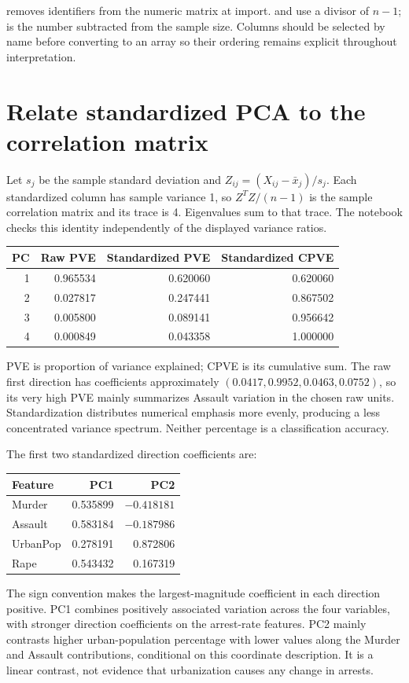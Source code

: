  removes identifiers from the numeric matrix at import.
 and  use a divisor of $n-1$;  is the number subtracted from the sample size.
Columns should be selected by name before converting to an array so their ordering remains explicit throughout interpretation.

\section{Relate standardized PCA to the correlation matrix}
Let $s_j$ be the sample standard deviation and $Z_{ij}=(X_{ij}-\bar x_j)/s_j$.
Each standardized column has sample variance 1, so $Z^TZ/(n-1)$ is the sample correlation matrix and its trace is 4.
Eigenvalues sum to that trace. The notebook checks this identity independently of the displayed variance ratios.

\begin{center}\begin{tabular}{rrrr}\toprule
PC&Raw PVE&Standardized PVE&Standardized CPVE\\\midrule
1&0.965534&0.620060&0.620060\\
2&0.027817&0.247441&0.867502\\
3&0.005800&0.089141&0.956642\\
4&0.000849&0.043358&1.000000\\\bottomrule\end{tabular}\end{center}
PVE is proportion of variance explained; CPVE is its cumulative sum.
The raw first direction has coefficients approximately $(0.0417,0.9952,0.0463,0.0752)$,
so its very high PVE mainly summarizes Assault variation in the chosen raw units.
Standardization distributes numerical emphasis more evenly, producing a less concentrated variance spectrum.
Neither percentage is a classification accuracy.

The first two standardized direction coefficients are:
\begin{center}\begin{tabular}{lrr}\toprule
Feature&PC1&PC2\\\midrule
Murder&0.535899&$-0.418181$\\
Assault&0.583184&$-0.187986$\\
UrbanPop&0.278191&0.872806\\
Rape&0.543432&0.167319\\\bottomrule\end{tabular}\end{center}
The sign convention makes the largest-magnitude coefficient in each direction positive.
PC1 combines positively associated variation across the four variables, with stronger direction coefficients on the arrest-rate features.
PC2 mainly contrasts higher urban-population percentage with lower values along the Murder and Assault contributions, conditional on this coordinate description.
It is a linear contrast, not evidence that urbanization causes any change in arrests.

